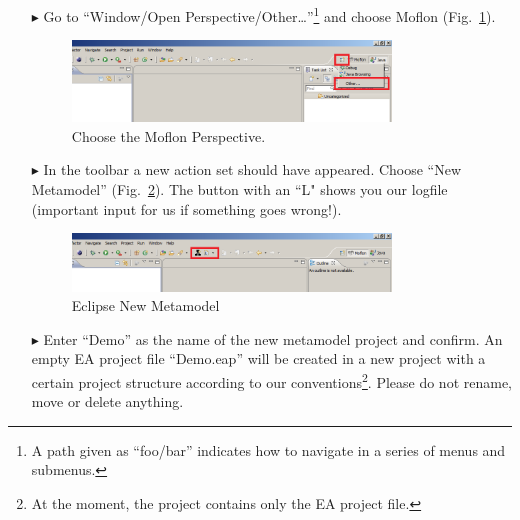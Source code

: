 \begin{enumerate}
\item[$\blacktriangleright$] Go to ``Window/Open
Perspective/Other\ldots''\footnote{A path given as ``foo/bar'' indicates how to
navigate in a series of menus and submenus.} and choose Moflon
(Fig.~\ref{fig_eclipse}). \begin{figure}[!h]
	\centering
  \includegraphics[width=0.8\textwidth]{pics/installationAndSetup/eclipse_firststart.png}
	\caption{Choose the Moflon Perspective.}
	\label{fig_eclipse}
\end{figure}

\item[$\blacktriangleright$] In the toolbar a new action set should have
appeared. Choose ``New Metamodel'' (Fig.~\ref{fig_eclipseNewMetamodel}).
The button with an ``L" shows you our logfile (important input for us if
something goes wrong!).
\begin{figure}[!h]
	\centering
  \includegraphics[width=0.8\textwidth]{pics/installationAndSetup/eclipse_metamodelButton.png}
	\caption{Eclipse New Metamodel}
	\label{fig_eclipseNewMetamodel}
\end{figure}

\item[$\blacktriangleright$] Enter ``Demo'' as the name of the new metamodel
project and confirm. 
An empty EA project file ``Demo.eap'' will be
created in a new project with a certain project structure
according to our conventions\footnote{At the moment, the project contains only the EA project file.}.
Please do not rename, move or delete anything.

\newpage


\end{enumerate}
